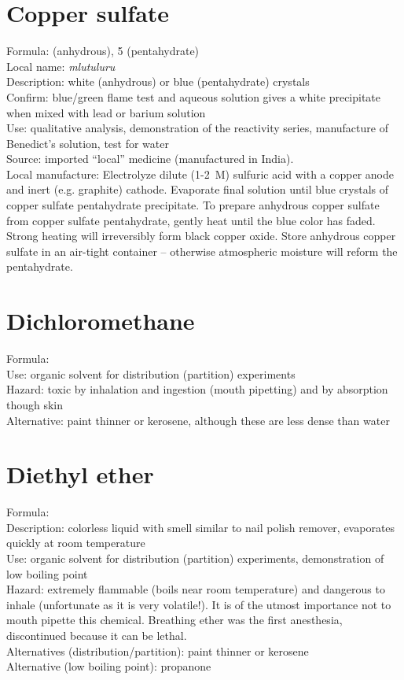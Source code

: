 \section{Copper sulfate}
Formula:  (anhydrous), 
 5 (pentahydrate)\\
Local name: \textit{mlutuluru}\\
Description: white (anhydrous) or blue (pentahydrate) crystals\\
Confirm: blue/green flame test 
and aqueous solution gives a white precipitate 
when mixed with lead or barium solution\\
Use: qualitative analysis, 
demonstration of the reactivity series, 
manufacture of Benedict's solution, 
test for water\\
Source: imported ``local'' medicine (manufactured in India).\\ 
Local manufacture: Electrolyze dilute (1-2~M) sulfuric acid 
with a copper anode and inert (e.g. 
graphite) cathode. 
Evaporate final solution until 
blue crystals of copper sulfate pentahydrate precipitate. 
To prepare anhydrous copper sulfate from copper sulfate pentahydrate, 
gently heat until the blue color has faded. 
Strong heating will irreversibly form black copper oxide. 
Store anhydrous copper sulfate in an air-tight container -- 
otherwise atmospheric moisture will reform the pentahydrate.

\section{Dichloromethane}
Formula: \\
Use: organic solvent for distribution (partition) experiments\\
Hazard: toxic by inhalation and ingestion (mouth pipetting) 
and by absorption though skin\\
Alternative: paint thinner or kerosene, 
although these are less dense than water

\section{Diethyl ether}
Formula: \\
Description: colorless liquid with smell similar to nail polish remover, 
evaporates quickly at room temperature\\
Use: organic solvent for distribution (partition) experiments, 
demonstration of low boiling point\\
Hazard: extremely flammable (boils near room temperature) 
and dangerous to inhale (unfortunate as it is very volatile!). 
It is of the utmost importance not to mouth pipette this chemical. 
Breathing ether was the first anesthesia, 
discontinued because it can be lethal.\\
Alternatives (distribution/partition): paint thinner or kerosene\\
Alternative (low boiling point): propanone

